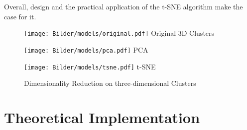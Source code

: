 Overall, design and the practical application of the \ac{t-SNE} algorithm make the case for it.




\begin{figure} 
	\begin{minipage}{0.3\textwidth}
		
		\texttt{[image: Bilder/models/original.pdf]}
		\captionsetup{labelformat=empty}
		\centering
		Original 3D Clusters
		\label{fig:original}
	\end{minipage}
	\hfill
	\begin{minipage}{0.3\textwidth}
		
		\texttt{[image: Bilder/models/pca.pdf]}
		\label{fig:pca}
		\captionsetup{labelformat=empty}
		\centering
		\ac{PCA}
	\end{minipage}
	\hfill
	\begin{minipage}{0.3\textwidth}
		
		\texttt{[image: Bilder/models/tsne.pdf]}
		\label{fig:tsne}
		\captionsetup{labelformat=empty}
		\centering
		\ac{t-SNE}
	\end{minipage}
\caption{Dimensionality Reduction on three-dimensional Clusters}
\end{figure} 

\section{Theoretical Implementation}

